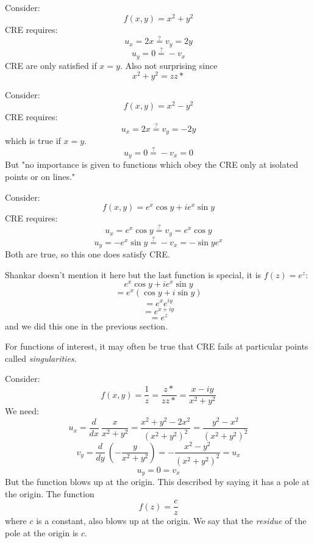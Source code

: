 \documentclass[11pt, oneside]{article}   	%
\begin{document}
Consider:
\[ f(x,y) = x^2 + y^2 \]
CRE requires:
\[ u_x = 2x \stackrel{?}{=}  v_y = 2y \]
\[ u_y = 0 \stackrel{?}{=}  -v_x \]
CRE are only satisfied if $x=y$.  Also not surprising since
\[ x^2 + y^2 = zz* \]

Consider:
\[ f(x,y) = x^2 - y^2 \]
CRE requires:
\[ u_x = 2x \stackrel{?}{=} v_y = -2y \]
which is true if $x = y$.
\[ u_y = 0 \stackrel{?}{=} -v_x = 0 \]
But "no importance is given to functions which obey the CRE only at isolated points or on lines."

Consider:
\[ f(x,y) = e^x \cos y + i e^x \sin y \]
CRE requires:
\[ u_x = e^x \cos y \stackrel{?}{=} v_y = e^x \cos y \]
\[ u_y = -e^x \sin y \stackrel{?}{=} -v_x = - \sin y e^x \]
Both are true, so this one does satisfy CRE.

Shankar doesn't mention it here but the last function is special, it is $f(z) = e^z$:
\[ e^x \cos y + i e^x \sin y \]
\[ = e^x (\cos y + i \sin y) \]
\[ = e^x e^{iy} \]
\[ = e^{x + iy} \]
\[ = e^z \]
and we did this one in the previous section.

For functions of interest, it may often be true that CRE fails at particular points called \emph{singularities}.

Consider:
\[ f(x,y) = \frac{1}{z} = \frac{z*}{zz*} = \frac{x-iy}{x^2 + y^2} \]
We need:
\[ u_x = \frac{d}{dx} \ \frac{x}{x^2 + y^2} = \frac{x^2 + y^2 - 2x^2}{(x^2 + y^2)^2}  = \frac{y^2 - x^2}{(x^2 + y^2)^2} \]
\[ v_y = \frac{d}{dy} \ (-\frac{y}{x^2 + y^2} ) = - \frac{x^2 - y^2}{(x^2 + y^2)^2} = u_x \]
\[ u_y =  0 = v_x \]
But the function blows up at the origin.  This described by saying it has a pole at the origin.
The function
\[ f(z) = \frac{c}{z} \]
where $c$ is a constant, also blows up at the origin.  We say that the \emph{residue} of the pole at the origin is $c$.
\end{document}
